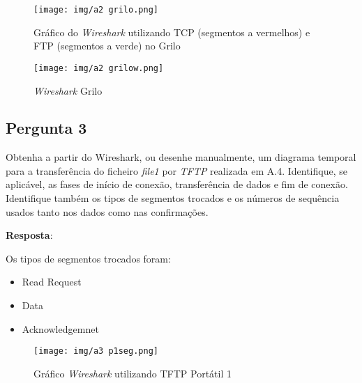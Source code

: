 \documentclass[runningheads]{llncs}
\begin{document}
    \begin{figure}[!ht]
    \centering
    \texttt{[image: img/a2 grilo.png]}
    \caption{Gráfico do \textit{Wireshark} utilizando TCP (segmentos a vermelhos) e FTP (segmentos a verde) no Grilo} 
    \label{fig:data22}
    \end{figure}
    
    \begin{figure}[ht]
    \centering
    \texttt{[image: img/a2 grilow.png]}
    \caption{\textit{Wireshark} Grilo} 
    \label{fig:data23}
    \end{figure}
    
    \pagebreak
    \paragraph{}
    \paragraph{}
    \paragraph{}
    \paragraph{}
    \subsection{Pergunta 3} 
    Obtenha a partir do Wireshark, ou desenhe manualmente, um diagrama temporal para a transferência do ficheiro \textit{file1} por \textit{TFTP} realizada em A.4. Identifique, se aplicável, as fases de início de conexão, transferência de dados e fim de conexão. Identifique também os tipos de segmentos trocados e os números de sequência usados tanto nos dados como nas confirmações.
    
    \bigskip
    
    \textbf{Resposta}: 
    
    Os tipos de segmentos trocados foram:
    \begin{itemize}
        \item Read Request
        \item Data
        \item Acknowledgemnet
    \end{itemize}
    
    \begin{figure}[!ht]
    \centering
    \texttt{[image: img/a3 p1seg.png]}
    \caption{Gráfico \textit{Wireshark} utilizando TFTP Portátil 1} 
    \label{fig:data33}
    \end{figure}
    
\end{document}
